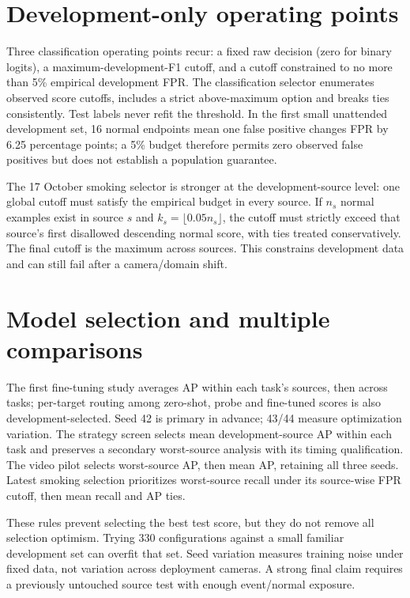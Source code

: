 \section{Development-only operating points}
Three classification operating points recur: a fixed raw decision (zero for binary logits), a maximum-development-F1 cutoff, and a cutoff constrained to no more than 5\% empirical development FPR. The classification selector enumerates observed score cutoffs, includes a strict above-maximum option and breaks ties consistently. Test labels never refit the threshold. In the first small unattended development set, 16 normal endpoints mean one false positive changes FPR by 6.25 percentage points; a 5\% budget therefore permits zero observed false positives but does not establish a population guarantee.

The 17 October smoking selector is stronger at the development-source level: one global cutoff must satisfy the empirical budget in every source. If $n_s$ normal examples exist in source $s$ and $k_s=\lfloor0.05n_s\rfloor$, the cutoff must strictly exceed that source's first disallowed descending normal score, with ties treated conservatively. The final cutoff is the maximum across sources. This constrains development data and can still fail after a camera/domain shift.

\section{Model selection and multiple comparisons}
The first fine-tuning study averages AP within each task's sources, then across tasks; per-target routing among zero-shot, probe and fine-tuned scores is also development-selected. Seed 42 is primary in advance; 43/44 measure optimization variation. The strategy screen selects mean development-source AP within each task and preserves a secondary worst-source analysis with its timing qualification. The video pilot selects worst-source AP, then mean AP, retaining all three seeds. Latest smoking selection prioritizes worst-source recall under its source-wise FPR cutoff, then mean recall and AP ties.

These rules prevent selecting the best test score, but they do not remove all selection optimism. Trying 330 configurations against a small familiar development set can overfit that set. Seed variation measures training noise under fixed data, not variation across deployment cameras. A strong final claim requires a previously untouched source test with enough event/normal exposure.

